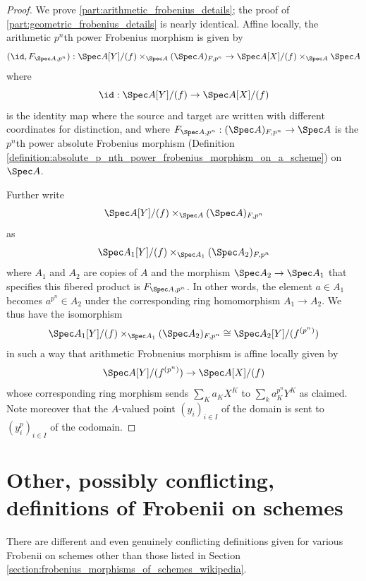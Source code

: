 \begin{proof}
    We prove \ref{part:arithmetic_frobenius_details}; the proof of \ref{part:geometric_frobenius_details} is nearly identical. Affine locally, the arithmetic $p^n$th power Frobenius morphism is given by 
    $$(\id, F_{\Spec A, p^n}): \Spec A[Y] / (f) \times_{\Spec A} (\Spec A)_{F,p^n} \to \Spec A[X] / (f) \times_{\Spec A} \Spec A$$
    where 
    $$\id: \Spec A[Y] / (f) \to \Spec A[X] / (f)$$
    is the identity map where the source and target are written with different coordinates for distinction, and where $F_{\Spec A, p^n}:(\Spec A)_{F,p^n} \to \Spec A$ is the $p^n$th power absolute Frobenius morphism (Definition \ref{definition:absolute_p_nth_power_frobenius_morphism_on_a_scheme}) on $\Spec A$. 

    Further write 
    $$\Spec A[Y] / (f) \times_{\Spec A} (\Spec A)_{F,p^n}$$
    as
    $$\Spec A_1[Y] / (f) \times_{\Spec A_1} (\Spec A_2)_{F,p^n}$$
    where $A_1$ and $A_2$ are copies of $A$ and the morphism $\Spec A_2 \to \Spec A_1$ that specifies this fibered product is $F_{\Spec A, p^n}$. In other words, the element $a \in A_1$ becomes $a^{p^n} \in A_2$ under the corresponding ring homomorphism $A_1 \to A_2$. We thus have the isomorphism
    $$\Spec A_1[Y] / (f) \times_{\Spec A_1} (\Spec A_2)_{F,p^n} \cong \Spec A_2[Y] / (f^{(p^n)})$$
    in such a way that arithmetic Frobnenius morphism is affine locally given by 
    $$\Spec A[Y] / (f^{(p^n)}) \to \Spec A[X]/(f)$$
    whose corresponding ring morphism sends $\sum_K a_K X^K$ to $\sum_k a_K^{p^n} Y^K$ as claimed. Note moreover that the $A$-valued point $(y_i)_{i \in I}$ of the domain is sent to $(y_i^p)_{i \in I}$ of the codomain.

\end{proof}

\section{Other, possibly conflicting, definitions of Frobenii on schemes}

There are different and even genuinely conflicting definitions given for various Frobenii on schemes other than those listed in Section \ref{section:frobenius_morphisms_of_schemes_wikipedia}. 

